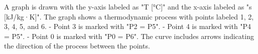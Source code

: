 A graph is drawn with the y-axis labeled as "T [°C]" and the x-axis labeled as "s [kJ/kg·K]". The graph shows a thermodynamic process with points labeled 1, 2, 3, 4, 5, and 6.  
- Point 3 is marked with "P2 = P5".  
- Point 4 is marked with "P4 = P5".  
- Point 0 is marked with "P0 = P6".  
The curve includes arrows indicating the direction of the process between the points.